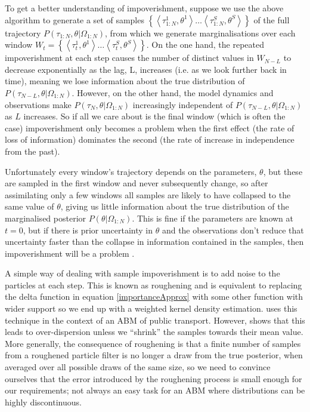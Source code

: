 \documentclass{article}
\begin{document}
To get a better understanding of impoverishment, suppose we use the above algorithm to generate a set of samples $\left\{\left<\tau_{1:N}^1,\theta^1\right> \dots \left<\tau_{1:N}^S,\theta^S\right>\right\}$ of the full trajectory $P(\tau_{1:N},\theta|\Omega_{1:N})$, from which we generate marginalisations over each window $W_t = \left\{\left<\tau_t^1,\theta^1\right> \dots \left<\tau_t^S,\theta^S\right>\right\}$. On the one hand, the repeated impoverishment at each step causes the number of distinct values in $W_{N-L}$ to decrease exponentially as the lag, L, increases (i.e. as we look further back in time), meaning we lose information about the true distribution of $P(\tau_{N-L},\theta|\Omega_{1:N})$. However, on the other hand, the model dynamics and observations make $P(\tau_{N},\theta|\Omega_{1:N})$ increasingly independent of $P(\tau_{N-L},\theta|\Omega_{1:N})$ as $L$ increases. So if all we care about is the final window (which is often the case) impoverishment only becomes a problem when the first effect (the rate of loss of information) dominates the second (the rate of increase in independence from the past).
  
Unfortunately every window's trajectory depends on the parameters, $\theta$, but these are sampled in the first window and never subsequently change, so after assimilating only a few windows all samples are likely to have collapsed to the same value of $\theta$, giving us little information about the true distribution of the marginalised posterior $P(\theta|\Omega_{1:N})$. This is fine if the parameters are known at $t=0$, but if there is prior uncertainty in $\theta$ and the observations don't reduce that uncertainty faster than the collapse in information contained in the samples, then impoverishment will be a problem \citep*{liu2001combined, andrieu2004particle}.

A simple way of dealing with sample impoverishment is to add noise to the particles at each step. This is known as roughening \citep*{gordon1993novel, li2014fight} and is equivalent to replacing the delta function in equation \eqref{importanceApprox} with some other function with wider support so we end up with a weighted kernel density estimation. \citet{kieu_dealing_2020} uses this technique in the context of an ABM of public transport. However, \citet{liu2001combined} shows that this leads to over-dispersion unless we ``shrink'' the samples towards their mean value. More generally, the consequence of roughening is that a finite number of samples from a roughened particle filter is no longer a draw from the true posterior, when averaged over all possible draws of the same size, so we need to convince ourselves that the error introduced by the roughening process is small enough for our requirements; not always an easy task for an ABM where distributions can be highly discontinuous.
\end{document}
